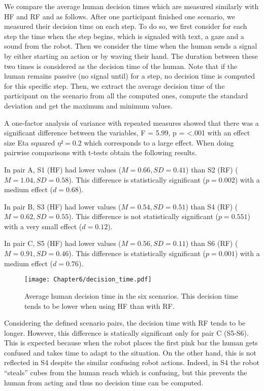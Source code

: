 We compare the average human decision times which are measured similarly with HF and RF and as follows. After one participant finished one scenario, we measured their decision time on each step. To do so, we first consider for each step the time when the step begins, which is signaled with text, a gaze and a sound from the robot. Then we consider the time when the human sends a signal by either starting an action or by waving their hand. The duration between these two times is considered as the decision time of the human. Note that if the human remains passive (no signal until) for a step, no decision time is computed for this specific step. Then, we extract the average decision time of the participant on the scenario from all the computed ones, compute the standard deviation and get the maximum and minimum values. 

A one-factor analysis of variance with repeated measures showed that there was a significant difference between the variables, F = 5.99, p = <.001 with an effect size Eta squared $\eta² = 0.2$ which corresponds to a large effect.
When doing pairwise comparisons with t-tests obtain the following results.

In pair A, S1 (HF) had lower values ($M=0.66, SD=0.41$) than S2 (RF) ($M=1.04, SD=0.58$). This difference is statistically significant ($p=0.002$) with a medium effect ($d=0.68$).

In pair B, S3 (HF) had lower values ($M=0.54, SD=0.51$) than S4 (RF) ($M=0.62, SD=0.55$). This difference is not statistically significant ($p=0.551$) with a very small effect ($d=0.12$).

In pair C, S5 (HF) had lower values ($M=0.56, SD=0.11$) than S6 (RF) ($M=0.91, SD=0.46$). This difference is statistically significant ($p=0.001$) with a medium effect ($d=0.76$).

\begin{figure}
    \center
    \texttt{[image: Chapter6/decision\_time.pdf]}
    \caption{Average human decision time in the six scenarios. This decision time tends to be lower when using HF than with RF.}
    \label{fig:decision_time}
\end{figure}

Considering the defined scenario pairs, the decision time with RF tends to be longer. However, this difference is statically significant only for pair C (S5-S6). This is expected because when the robot places the first pink bar the human gets confused and takes time to adapt to the situation. On the other hand, this is not reflected in S4 despite the similar confusing robot actions. Indeed, in S4 the robot ``steals'' cubes from the human reach which is confusing, but this prevents the human from acting and thus no decision time can be computed.  

